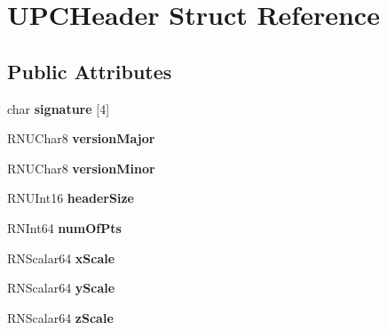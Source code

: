 \hypertarget{struct_u_p_c_header}{}\section{U\+P\+C\+Header Struct Reference}
\label{struct_u_p_c_header}
\subsection*{Public Attributes}
\begin{DoxyCompactItemize}
\item 
char {\bfseries signature} \mbox{[}4\mbox{]}\hypertarget{struct_u_p_c_header_a12fbc670d48b96f992772b940e310c30}{}\label{struct_u_p_c_header_a12fbc670d48b96f992772b940e310c30}

\item 
R\+N\+U\+Char8 {\bfseries version\+Major}\hypertarget{struct_u_p_c_header_a7ba0c097370c273ab9e76530763a3c7b}{}\label{struct_u_p_c_header_a7ba0c097370c273ab9e76530763a3c7b}

\item 
R\+N\+U\+Char8 {\bfseries version\+Minor}\hypertarget{struct_u_p_c_header_a4a90941cafd58118ce0780878fd44da9}{}\label{struct_u_p_c_header_a4a90941cafd58118ce0780878fd44da9}

\item 
R\+N\+U\+Int16 {\bfseries header\+Size}\hypertarget{struct_u_p_c_header_a810190472b0734f7423934869ed35a36}{}\label{struct_u_p_c_header_a810190472b0734f7423934869ed35a36}

\item 
R\+N\+Int64 {\bfseries num\+Of\+Pts}\hypertarget{struct_u_p_c_header_a6f2050d3ed9678094f210c6c44a6da3c}{}\label{struct_u_p_c_header_a6f2050d3ed9678094f210c6c44a6da3c}

\item 
R\+N\+Scalar64 {\bfseries x\+Scale}\hypertarget{struct_u_p_c_header_aa97ac02fa0d2a4bb581fdcf8395c78d4}{}\label{struct_u_p_c_header_aa97ac02fa0d2a4bb581fdcf8395c78d4}

\item 
R\+N\+Scalar64 {\bfseries y\+Scale}\hypertarget{struct_u_p_c_header_a644196f2daf59c81263fef9bcb6099f0}{}\label{struct_u_p_c_header_a644196f2daf59c81263fef9bcb6099f0}

\item 
R\+N\+Scalar64 {\bfseries z\+Scale}\hypertarget{struct_u_p_c_header_a13d8fa361114a1a2abd8d81e8df672ba}{}\label{struct_u_p_c_header_a13d8fa361114a1a2abd8d81e8df672ba}


\end{DoxyCompactItemize}
